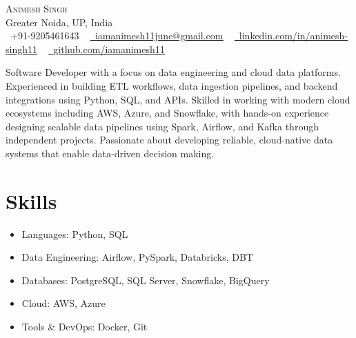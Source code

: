 \documentclass[letterpaper,11pt]{article}
\renewcommand{\textbf}[1]{{\fontseries{b}\selectfont #1}}
\begin{document}
\begin{center}
    {\LARGE \scshape Animesh Singh} \\ \vspace{2pt}
    \small Greater Noida, UP, India \\ \vspace{2pt}
    \small
    \raisebox{-0.1\height}\faPhone\ +91-9205461643 ~
    \href{mailto:iamanimesh11june@gmail.com}{\raisebox{-0.2\height}\faEnvelope\ \underline{iamanimesh11june@gmail.com}} ~
    \href{https://linkedin.com/in/animesh-singh11}{\raisebox{-0.2\height}\faLinkedin\ \underline{linkedin.com/in/animesh-singh11}} ~
    \href{https://github.com/iamanimesh11}{\raisebox{-0.2\height}\faGithub\ \underline{github.com/iamanimesh11}}
    \vspace{-8pt}
\end{center}

\vspace{3pt}

{\small Software Developer with a focus on data engineering and cloud data platforms. Experienced in building ETL workflows, data ingestion pipelines, and backend integrations using Python, SQL, and APIs. Skilled in working with modern cloud ecosystems including \textbf{AWS, Azure, and Snowflake}, with hands-on experience designing scalable data pipelines using Spark, Airflow, and Kafka through independent projects. Passionate about developing reliable, cloud-native data systems that enable data-driven decision making.}
\vspace{-10pt}


\section{Skills}
\vspace{5pt}

{\small
\begin{itemize}[leftmargin=*, itemsep=2pt]
  \item \textbf{Languages:} Python, SQL
  \item \textbf{Data Engineering:} Airflow, PySpark, Databricks, DBT
  \item \textbf{Databases:} PostgreSQL, SQL Server, Snowflake, BigQuery
  \item \textbf{Cloud:} AWS, Azure
  \item \textbf{Tools \& DevOps:} Docker, Git
\end{itemize}
}
\end{document}
